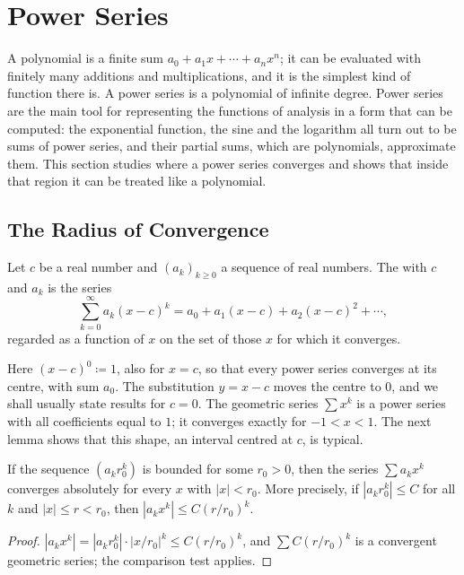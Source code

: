 \section{Power Series}
\label{sec:power-series}

A polynomial is a finite sum $a_0+a_1x+\cdots+a_nx^n$; it can be evaluated with finitely many additions and multiplications, and it is the simplest kind of function there is. A power series is a polynomial of infinite degree. Power series are the main tool for representing the functions of analysis in a form that can be computed: the exponential function, the sine and the logarithm all turn out to be sums of power series, and their partial sums, which are polynomials, approximate them. This section studies where a power series converges and shows that inside that region it can be treated like a polynomial.

\subsection{The Radius of Convergence}

\begin{definition}
\label{def:power-series}
Let $c$ be a real number and $(a_k)_{k\ge0}$ a sequence of real numbers. The  with  $c$ and  $a_k$ is the series
\[
\sum_{k=0}^\infty a_k(x-c)^k=a_0+a_1(x-c)+a_2(x-c)^2+\cdots,
\]
regarded as a function of $x$ on the set of those $x$ for which it converges.
\end{definition}

Here $(x-c)^0\coloneqq1$, also for $x=c$, so that every power series converges at its centre, with sum $a_0$. The substitution $y=x-c$ moves the centre to $0$, and we shall usually state results for $c=0$. The geometric series $\sum x^k$ is a power series with all coefficients equal to $1$; it converges exactly for $-1<x<1$. The next lemma shows that this shape, an interval centred at $c$, is typical.

\begin{lemma}
\label{lem:abel}
If the sequence $(a_kr_0^k)$ is bounded for some $r_0>0$, then the series $\sum a_kx^k$ converges absolutely for every $x$ with $|x|<r_0$. More precisely, if $|a_kr_0^k|\le C$ for all $k$ and $|x|\le r<r_0$, then $|a_kx^k|\le C(r/r_0)^k$.
\end{lemma}

\begin{proof}
$|a_kx^k|=|a_kr_0^k|\cdot|x/r_0|^k\le C(r/r_0)^k$, and $\sum C(r/r_0)^k$ is a convergent geometric series; the comparison test applies.
\end{proof}

